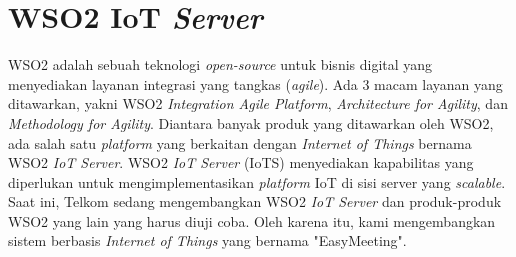\section{WSO2 IoT \textit{Server}}
\tab WSO2 adalah sebuah teknologi \textit{open-source} untuk bisnis digital yang menyediakan layanan integrasi yang tangkas (\textit{agile}). Ada 3 macam layanan yang ditawarkan, yakni WSO2 \textit{Integration Agile Platform}, \textit{Architecture for Agility}, dan \textit{Methodology for Agility}. Diantara banyak produk yang ditawarkan oleh WSO2, ada salah satu \textit{platform} yang berkaitan dengan \textit{Internet of Things} bernama WSO2 \textit{IoT Server}. WSO2 \textit{IoT Server} (IoTS) menyediakan kapabilitas yang diperlukan untuk mengimplementasikan \textit{platform} IoT di sisi server yang \textit{scalable}.\\
\tab Saat ini, Telkom sedang mengembangkan WSO2 \textit{IoT Server} dan produk-produk WSO2 yang lain yang harus diuji coba. Oleh karena itu, kami mengembangkan sistem berbasis \textit{Internet of Things} yang bernama "EasyMeeting".

\cleardoublepage